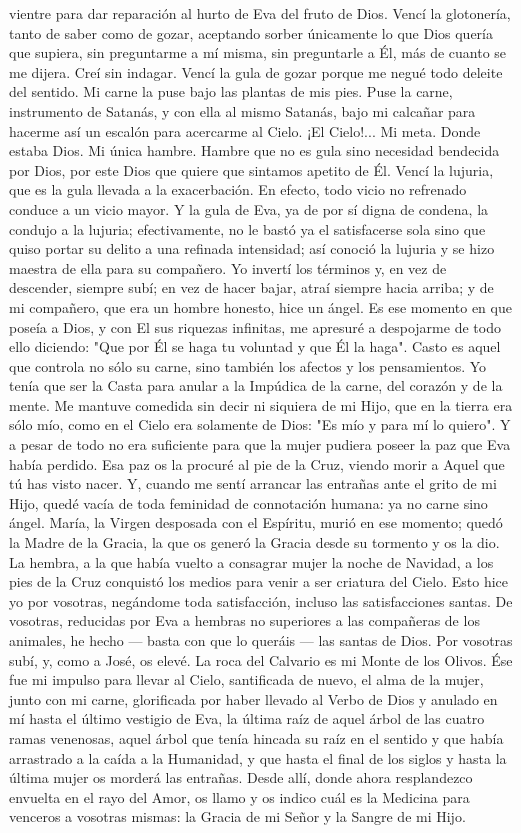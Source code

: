 \documentclass[12pt]{book} %
\begin{document}
vientre para dar reparación al hurto de Eva del fruto de Dios. 
Vencí la glotonería, tanto de saber como de gozar, aceptando sorber únicamente lo que Dios quería que supiera, sin 
preguntarme a mí misma, sin preguntarle a Él, más de cuanto se me dijera. Creí sin indagar. Vencí la gula de gozar porque me negué todo deleite del sentido. Mi carne la puse bajo las plantas de mis pies. Puse la carne, instrumento de Satanás, y con ella al mismo Satanás, bajo mi calcañar para hacerme así un escalón para acercarme al Cielo. ¡El Cielo!... Mi meta. Donde estaba Dios. 
Mi única hambre. Hambre que no es gula sino necesidad bendecida por Dios, por este Dios que quiere que sintamos apetito de 
Él. 
Vencí la lujuria, que es la gula llevada a la exacerbación. En efecto, todo vicio no refrenado conduce a un vicio mayor. Y 
la gula de Eva, ya de por sí digna de condena, la condujo a la lujuria; efectivamente, no le bastó ya el satisfacerse sola sino que quiso portar su delito a una refinada intensidad; así conoció la lujuria y se hizo maestra de ella para su compañero. Yo invertí los términos y, en vez de descender, siempre subí; en vez de hacer bajar, atraí siempre hacia arriba; y de mi compañero, que era un hombre honesto, hice un ángel. 
Es ese momento en que poseía a Dios, y con El sus riquezas infinitas, me apresuré a despojarme de todo ello diciendo: "Que por Él se haga tu voluntad y que Él la haga". Casto es aquel que controla no sólo su carne, sino también los afectos y los pensamientos. Yo tenía que ser la Casta para anular a la Impúdica de la carne, del corazón y de la mente. Me mantuve comedida sin decir ni siquiera de mi Hijo, que en la tierra era sólo mío, como en el Cielo era solamente de Dios: "Es mío y para mí lo quiero". 
Y a pesar de todo no era suficiente para que la mujer pudiera poseer la paz que Eva había perdido. Esa paz os la procuré 
al pie de la Cruz, viendo morir a Aquel que tú has visto nacer. Y, cuando me sentí arrancar las entrañas ante el grito de mi Hijo, quedé vacía de toda feminidad de connotación humana: ya no carne sino ángel. María, la Virgen desposada con el Espíritu, murió en ese momento; quedó la Madre de la Gracia, la que os generó la Gracia desde su tormento y os la dio. La hembra, a la que había vuelto a consagrar mujer la noche de Navidad, a los pies de la Cruz conquistó los medios para venir a ser criatura del Cielo. 
Esto hice yo por vosotras, negándome toda satisfacción, incluso las satisfacciones santas. De vosotras, reducidas por Eva a hembras no superiores a las compañeras de los animales, he hecho — basta con que lo queráis — las santas de Dios. Por vosotras subí, y, como a José, os elevé. La roca del Calvario es mi Monte de los Olivos. Ése fue mi impulso para llevar al Cielo, santificada de nuevo, el alma de la mujer, junto con mi carne, glorificada por haber llevado al Verbo de Dios y anulado en mí hasta el último vestigio de Eva, la última raíz de aquel árbol de las cuatro ramas venenosas, aquel árbol que tenía hincada su raíz en el sentido y que había arrastrado a la caída a la Humanidad, y que hasta el final de los siglos y hasta la última mujer os morderá las entrañas. Desde allí, donde ahora resplandezco envuelta en el rayo del Amor, os llamo y os indico cuál es la Medicina para venceros a vosotras mismas: la Gracia de mi Señor y la Sangre de mi Hijo. 
\end{document}
